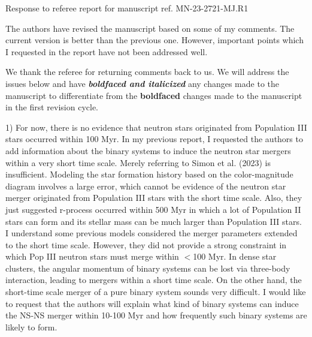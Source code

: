\documentclass[11pt]{article}
\begin{document}
\begin{center} 
\bfseries{
\begin{large}
  Response to referee report for manuscript ref. MN-23-2721-MJ.R1
\end{large}
}
\end{center}

\begin{tcolorbox}[colback={lightgray}]
The authors have revised the manuscript based on some of my comments. The current version is better than the previous one. However, important points which I requested in the report have not been addressed well.
\end{tcolorbox}

We thank the referee for returning comments back to us. We will address the issues below and have \textit{\textbf{boldfaced and italicized}} any changes made to the manuscript to differentiate from the \textbf{boldfaced} changes made to the manuscript in the first revision cycle.

\begin{tcolorbox}[colback={lightgray}]
1) For now, there is no evidence that neutron stars originated from Population III stars occurred within 100 Myr. In my previous report, I requested the authors to add information about the binary systems to induce the neutron star mergers within a very short time scale. Merely referring to Simon et al. (2023) is insufficient. Modeling the star formation history based on the color-magnitude diagram involves a large error, which cannot be evidence of the neutron star merger originated from Population III stars with the short time scale. Also, they just suggested r-process occurred within 500 Myr in which a lot of Population II stars can form and its stellar mass can be much larger than Population III stars. I understand some previous models considered the merger parameters extended to the short time scale. However, they did not provide a strong constraint in which Pop III neutron stars must merge within $<$100 Myr. In dense star clusters, the angular momentum of binary systems can be lost via three-body interaction, leading to mergers within a short time scale. On the other hand, the short-time scale merger of a pure binary system sounds very difficult. I would like to request that the authors will explain what kind of binary systems can induce the NS-NS merger within 10-100 Myr and how frequently such binary systems are likely to form.
\end{tcolorbox}
\end{document}
